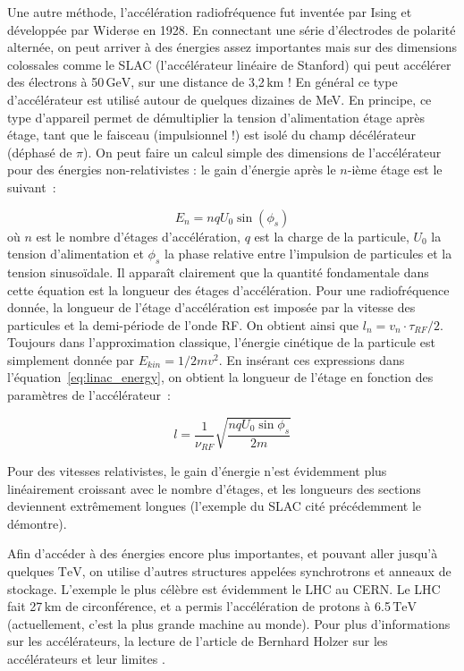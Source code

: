 \documentclass[a4paper]{book}
\begin{document}
Une autre méthode, l'accélération radiofréquence fut inventée par Ising et développée par Wider{\o}e en 1928. En connectant une série d'électrodes de polarité alternée, on peut arriver à des énergies assez importantes mais sur des dimensions colossales comme le SLAC (l'accélérateur linéaire de Stanford) qui peut accélérer des électrons à 50$\,\mathrm{GeV}$, sur une distance de 3,2$\,\mathrm{km}$ ! En général ce type d'accélérateur est utilisé autour de quelques dizaines de MeV. En principe, ce type d'appareil permet de démultiplier la tension d'alimentation étage après étage, tant que le faisceau (impulsionnel !) est isolé du champ décélérateur (déphasé de $\pi$). On peut faire un calcul simple des dimensions de l'accélérateur pour des énergies non-relativistes : le gain d'énergie après le $n$-ième étage est le suivant~:

\begin{equation}
    E_n=nqU_0\sin\left(\phi_s\right)
    \label{eq:linac_energy}
\end{equation}
où $n$ est le nombre d'étages d'accélération, $q$ est la charge de la particule, $U_0$ la tension d'alimentation et $\phi_s$ la phase relative entre l'impulsion de particules et la tension sinusoïdale. 
Il apparaît clairement que la quantité fondamentale dans cette équation est la longueur des étages d'accélération. Pour une radiofréquence donnée, la longueur de l'étage d'accélération est imposée par la vitesse des particules et la demi-période de l'onde RF. On obtient ainsi que $l_n = v_n\cdot \tau_{RF}/2$. Toujours dans l'approximation classique, l'énergie cinétique de la particule est simplement donnée par $E_{kin} = 1/2mv^2$. En insérant ces expressions dans l'équation~\ref{eq:linac_energy}, on obtient la longueur de l'étage en fonction des paramètres de l'accélérateur~:

\begin{equation}
    l=\frac{1}{\nu_{RF}}\sqrt{\frac{nqU_0\sin{\phi_s}}{2m}}
\end{equation}

Pour des vitesses relativistes, le gain d'énergie n'est évidemment plus linéairement croissant avec le nombre d'étages, et les longueurs des sections deviennent extrêmement longues (l'exemple du SLAC cité précédemment le démontre). 

Afin d'accéder à des énergies encore plus importantes, et pouvant aller jusqu'à quelques $\mathrm{TeV}$, on utilise d'autres structures appelées synchrotrons et anneaux de stockage. L'exemple le plus célèbre est évidemment le LHC au CERN. Le LHC fait 27$\,\mathrm{km}$ de circonférence, et a permis l'accélération de protons à 6.5$\,\mathrm{TeV}$ (actuellement, c'est la plus grande machine au monde). 
Pour plus d'informations sur les accélérateurs, la lecture de l'article de Bernhard Holzer sur les accélérateurs et leur limites \cite{holzer}. 
\end{document}
